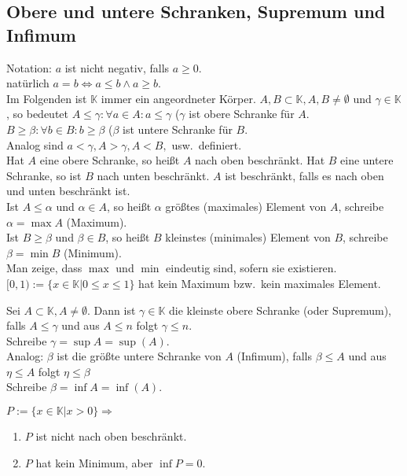 \documentclass[../ana1.tex]{subfiles}
\begin{document}
\subsection{Obere und untere Schranken, Supremum und Infimum}
\begin{prosa}
	Notation: \(a\) ist nicht negativ, falls \(a\geq 0\).\\
	natürlich \(a=b\Leftrightarrow a\leq b \wedge a \geq b\).\\
	Im Folgenden ist \(\mathbb{K}\) immer ein angeordneter Körper. \(A,B \subset \mathbb{K}, A,B\neq \emptyset \) und \( \gamma \in \mathbb{K}\), so bedeutet \(A\leq \gamma: \forall a\in A: a \leq \gamma \) (\( \gamma \) ist obere Schranke für \(A\).\\
	\(B\geq \beta: \forall b\in B: b\geq \beta \) (\( \beta \) ist untere Schranke für \(B\).\\
	Analog sind \(a<\gamma, A>\gamma, A<B, \) usw.\ definiert.\\
	Hat \(A\) eine obere Schranke, so heißt \(A\) nach oben beschränkt. Hat \(B\) eine untere Schranke, so ist \(B\) nach unten beschränkt. \(A\) ist beschränkt, falls es nach oben und unten beschränkt ist.\\
	Ist \(A\leq \alpha \) und \( \alpha\in A\), so heißt \( \alpha \) größtes (maximales) Element von \(A\), schreibe \( \alpha = \max A\) (Maximum).\\
	Ist \(B\geq \beta \) und \( \beta\in B\), so heißt \(B\) kleinstes (minimales) Element von \(B\), schreibe \( \beta = \min B\) (Minimum).\\
	Man zeige, dass \( \max \) und \( \min \) eindeutig sind, sofern sie existieren.\\
	\( [0,1) := \{x\in\mathbb{K}|0\leq x\leq 1\} \) hat kein Maximum bzw.\ kein maximales Element.
\end{prosa}
\begin{defi}
	Sei \(A\subset \mathbb{K}, A\neq \emptyset \). Dann ist \( \gamma\in\mathbb{K}\) die kleinste obere Schranke (oder Supremum), falls \(A\leq \gamma \) und aus \(A\leq n\) folgt \( \gamma \leq n\).\\
	Schreibe \( \gamma = \sup A = \sup(A)\).\\
	Analog: \( \beta \) ist die größte untere Schranke von \(A\) (Infimum), falls \( \beta \leq A\) und aus \( \eta \leq A\) folgt \( \eta \leq \beta\) \\
	Schreibe \( \beta = \inf A = \inf(A)\).
\end{defi}
\begin{bsp}
	\(P := \{x\in\mathbb{K}|x>0\} \Rightarrow \)
	\begin{enumerate}
		\item \(P\) ist nicht nach oben beschränkt.
		\item \(P\) hat kein Minimum, aber \( \inf P = 0\).
	\end{enumerate}
\end{bsp}
\end{document}
